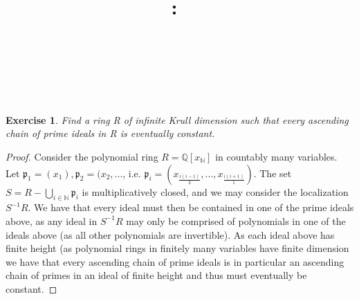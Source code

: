 \documentclass{article}
\title{
    \vspace{2in}
    \textmd{\textbf{\hmwkClass:\ \hmwkTitle}}\\
    \vspace{0.1in}
    \textmd{\hmwkDueDate} \\
    \vspace{0.2in}\large{\textit{\hmwkClassInstructor\  }}
    \vspace{2in}
}
\author{\hmwkAuthorName}
\date{}
\newcommand{\bb}[1]{\mathbb{#1}}
\newcommand{\fk}[1]{\mathfrak{#1}}
\newtheorem{exercise}{Exercise}
\begin{document}
\maketitle

\newpage

\begin{exercise}
  Find a ring R of infinite Krull dimension such that every ascending chain of prime ideals in R is eventually constant.
\end{exercise}
\begin{proof}
  Consider the polynomial ring $R = \bb{Q}[x_{\bb{N}}]$ in countably many variables. Let $\fk{p}_{1} = (x_{1}), \fk{p}_{2} = (x_{2},...$, i.e. $\fk{p}_{i} = (x_{\frac{i(i-1)}{2}},...,x_{\frac{i(i+1)}{1}})$. The set $S = R - \bigcup_{i \in \bb{N}}\fk{p}_{i}$ is multiplicatively closed, and we may consider the localization $S^{-1}R$. We have that every ideal must then be contained in one of the prime ideals above, as any ideal in $S^{-1}R$ may only be comprised of polynomials in one of the ideals above (as all other polynomials are invertible). As each ideal above has finite height (as polynomial rings in finitely many variables have finite dimension we have that every ascending chain of prime ideals is in particular an ascending chain of primes in an ideal of finite height and thus must eventually be constant.  
\end{proof}
\end{document}
